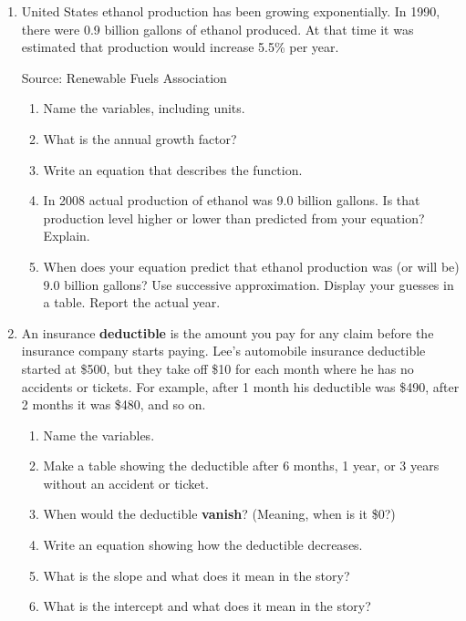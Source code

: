 \begin{enumerate} 

\item United States ethanol production has been growing exponentially. In 1990, there were 0.9 billion gallons of ethanol produced.  At that time it was estimated that production would increase 5.5\% per year.
\hfill \begin{footnotesize} Source:  Renewable Fuels Association \end{footnotesize} 
\begin{enumerate}
\item Name the variables, including units. \vfill 
\item What is the annual growth factor?  \vfill 
\item Write an equation that describes the function.  \vfill 
\item In 2008 actual production of ethanol was 9.0 billion gallons.  Is that production level higher or lower than predicted from your equation?  Explain.  \vfill 
\item When does your equation predict that ethanol production was (or will be) 9.0 billion gallons? Use successive approximation.  Display your guesses in a table.  Report the actual year.  \vfill   \vfill 
\end{enumerate}  

\newpage %

 \item An insurance \textbf{deductible} is the amount you pay for any claim before the insurance company starts paying. Lee's automobile insurance deductible started at \$500, but they take off \$10 for each month where he has no accidents or tickets.  For example, after 1 month his deductible was \$490, after 2 months it was \$480, and so on.
\begin{enumerate}
\item Name the variables.   \vfill  
\item Make a table showing the deductible after 6 months, 1 year, or 3 years without an accident or ticket. \vfill 
\item When would the deductible  \textbf{vanish}? (Meaning, when is it \$0?)  \vfill 
\item Write an equation showing how the deductible decreases.  \vfill 
\item What is the slope and what does it mean in the story?  \vfill 
\item What is the intercept and what does it mean in the story?  \vfill 
\end{enumerate} 


\end{enumerate}
